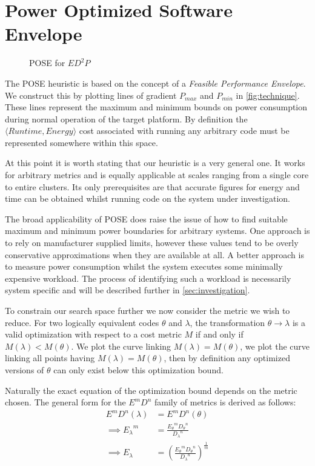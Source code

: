 \section{Power Optimized Software Envelope}
\label{sec:pose}

\begin{figure}
\centering

\caption{POSE for $ED^2P$}
\label{fig:technique}
\end{figure}

The POSE heuristic is based on the concept of a \emph{Feasible Performance Envelope}.
We construct this by plotting lines of gradient $P_{max}$ and $P_{min}$ in \autoref{fig:technique}.
These lines represent the maximum and minimum bounds on power consumption during normal operation of the target platform.
By definition the $\langle Runtime, Energy\rangle$ cost associated with running any arbitrary code must be represented somewhere within this space.

At this point it is worth stating that our heuristic is a very general one.
It works for arbitrary metrics and is equally applicable at scales ranging from a single core to entire clusters.
Its only prerequisites are that accurate figures for energy and time can be obtained whilst running code on the system under investigation.

The broad applicability of POSE does raise the issue of how to find suitable maximum and minimum power boundaries for arbitrary systems. 
One approach is to rely on manufacturer supplied limits, however these values tend to be overly conservative approximations when they are available at all.
A better approach is to measure power consumption whilst the system executes some minimally expensive workload. 
The process of identifying such a workload is necessarily system specific and will be described further in \autoref{sec:investigation}.

To constrain our search space further we now consider the metric we wish to reduce.
For two logically equivalent codes $\theta$ and $\lambda$, the transformation $\theta \to \lambda$ is a valid optimization with respect to a cost metric $M$ if and only if $M(\lambda) < M(\theta)$.
We plot the curve linking $M(\lambda) = M(\theta)$,
 we plot the curve linking all points having $M(\lambda) = M(\theta)$, then by definition any optimized versions of $\theta$ can only exist below this optimization bound.

Naturally the exact equation of the optimization bound depends on the metric chosen. 
The general form for the $E^mD^n$ family of metrics is derived as follows:
\begin{align}
E^mD^n(\lambda) &= E^mD^n(\theta) \nonumber \\
\implies {E_\lambda}^m &= \frac{{E_\theta}^m{D_\theta}^n}{{D_\lambda}^n} \nonumber \\
\implies E_\lambda &= (\frac{{E_\theta}^m{D_\theta}^n}{{D_\lambda}^n})^\frac{1}{m}
\end{align}

